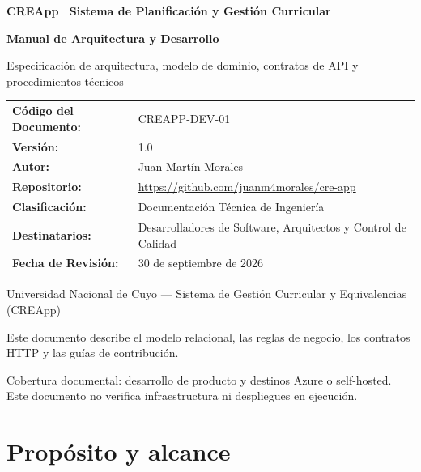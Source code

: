 \documentclass[10pt,a4paper,oneside]{article}
\begin{document}
\begin{titlepage}
\thispagestyle{empty}
\vspace*{1.5cm}
{\Large\bfseries\color{CREBlue} CREApp \textbar\ Sistema de Planificación y Gestión Curricular\par}
\vspace{1.2cm}
{\Huge\bfseries Manual de Arquitectura y Desarrollo\par}
\vspace{0.6cm}
{\large\color{black!80} Especificación de arquitectura, modelo de dominio, contratos de API y procedimientos técnicos\par}
\vspace{1.0cm}
\noindent{\color{CREBlue}\rule{\textwidth}{1.5pt}}
\vspace{1.0cm}

\begin{table}[h]
\centering
\begin{tabular}{ll}
\toprule
\textbf{Código del Documento:} & CREAPP-DEV-01 \\
\textbf{Versión:} & 1.0 \\
\textbf{Autor:} & Juan Martín Morales \\
\textbf{Repositorio:} & \url{https://github.com/juanm4morales/cre-app} \\
\textbf{Clasificación:} & Documentación Técnica de Ingeniería \\
\textbf{Destinatarios:} & Desarrolladores de Software, Arquitectos y Control de Calidad \\
\textbf{Fecha de Revisión:} & 30 de septiembre de 2026 \\
\bottomrule
\end{tabular}
\end{table}

\vfill
{\small\color{black!70}
Universidad Nacional de Cuyo --- Sistema de Gestión Curricular y Equivalencias (CREApp)\par
Este documento describe el modelo relacional, las reglas de negocio, los contratos HTTP y las guías de contribución.
\par\vspace{0.25em}
Cobertura documental: desarrollo de producto y destinos Azure o self-hosted. Este documento no verifica infraestructura ni despliegues en ejecución.
}
\end{titlepage}
\tableofcontents
\clearpage
{}
\section*{Propósito y alcance}
\end{document}
